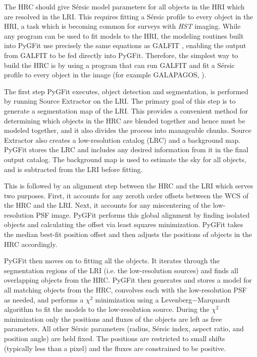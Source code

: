 \documentclass[preprint]{aastex}
\newcommand{\sersic}{S\'{e}rsic}
\newcommand{\galfit}{GALFIT}
\newcommand{\pygfit}{PyGFit}
\newcommand{\extractor}{Source Extractor}
\newcommand{\galapagos}{GALAPAGOS}
\begin{document}
The HRC should give \sersic{} model parameters for all objects in the HRI which are resolved in the LRI.  This requires fitting a \sersic{} profile to every object in the HRI, a task which is becoming common for surveys with {\itshape HST} imaging.  While any program can be used to fit models to the HRI, the modeling routines built into \pygfit{} use precisely the same equations as \galfit{} \citep{peng02,peng10}, enabling the output from \galfit{} to be fed directly into \pygfit{}.  Therefore, the simplest way to build the HRC is by using a program that can run \galfit{} and fit a \sersic{} profile to every object in the image (for example \galapagos{}, \citealt{galapagos}).

The first step \pygfit{} executes, object detection and segmentation, is performed by running \extractor{} \citep{bertin96} on the LRI.  The primary goal of this step is to generate a segmentation map of the LRI.  This provides a convenient method for determining which objects in the HRC are blended together and hence must be modeled together, and it also divides the process into manageable chunks.  \extractor{} also creates a low-resolution catalog (LRC) and a background map.  \pygfit{} stores the LRC and includes any desired information from it in the final output catalog.  The background map is used to estimate the sky for all objects, and is subtracted from the LRI before fitting.

This is followed by an alignment step between the HRC and the LRI which serves two purposes.  First, it accounts for any zeroth order offsets between the WCS of the HRC and the LRI.  Next, it accounts for any miscentering of the low-resolution PSF image.  \pygfit{} performs this global alignment by finding isolated objects and calculating the offset via least squares minimization.  \pygfit{} takes the median best-fit position offset and then adjusts the positions of objects in the HRC accordingly.

\pygfit{} then moves on to fitting all the objects.  It iterates through the segmentation regions of the LRI (i.e. the low-resolution sources) and finds all overlapping objects from the HRC.  \pygfit{} then generates and stores a model for all matching objects from the HRC, convolves each with the low-resolution PSF as needed, and performs a $\chi^2$ minimization using a Levenberg$-$Marquardt algorithm to fit the models to the low-resolution source.  During the $\chi^2$ minimization only the positions and fluxes of the objects are left as free parameters.  All other \sersic{} parameters (radius, \sersic{} index, aspect ratio, and position angle) are held fixed.  The positions are restricted to small shifts (typically less than a pixel) and the fluxes are constrained to be positive.
\end{document}
